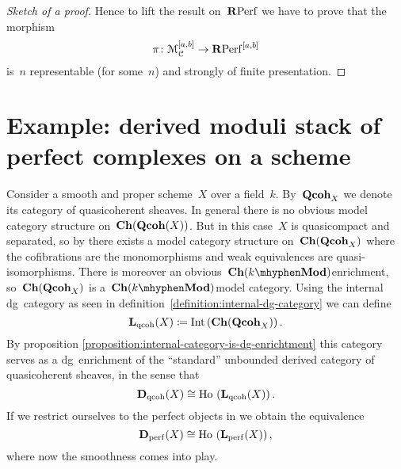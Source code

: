\begin{refsection}
\begin{theorem}
\begin{proof}[Sketch of a proof]
    Hence to lift the result on~$\mathbf{R}\mathrm{Perf}$ we have to prove that the morphism
    \begin{equation}
      \pi\colon\mathcal{M}_{\mathcal{C}}^{[a,b]}\to\mathbf{R}\mathrm{Perf}^{[a,b]}
    \end{equation}
    is~$n$ representable (for some~$n$) and strongly of finite presentation.
  \end{proof}
\end{theorem}

\section{Example: derived moduli stack of perfect complexes on a scheme}
\label{section:example}
Consider a smooth and proper scheme~$X$ over a field~$k$. By~$\mathbf{Qcoh}_X$ we denote its category of quasicoherent sheaves. In general there is no obvious model category structure on~$\mathbf{Ch}(\mathbf{Qcoh}(X))$. But in this case~$X$ is quasicompact and separated, so by \cite{hovey-sheaves} there exists a model category structure on~$\mathbf{Ch}(\mathbf{Qcoh}_X)$ where the cofibrations are the monomorphisms and weak equivalences are quasi-isomorphisms. There is moreover an obvious~$\Ch(k\mhyphen\Mod)$\dash enrichment, so~$\mathbf{Ch}(\mathbf{Qcoh}_X)$ is a~$\Ch(k\mhyphen\Mod)$\dash model category. Using the internal dg~category as seen in definition~\ref{definition:internal-dg-category} we can define
\begin{equation}
  \mathbf{L}_{\mathrm{qcoh}}(X)\coloneqq\operatorname{Int}\left( \mathbf{Ch}(\mathbf{Qcoh}_X) \right).
\end{equation}
By proposition \ref{proposition:internal-category-is-dg-enrichtment} this category serves as a dg~enrichment of the ``standard'' unbounded derived category of quasicoherent sheaves, in the sense that
\begin{equation}
  \mathbf{D}_{\mathrm{qcoh}}(X)\cong\operatorname{\mathrm{Ho} \,}\left( \mathbf{L}_{\mathrm{qcoh}}(X) \right).
\end{equation}
If we restrict ourselves to the perfect objects in we obtain the equivalence
\begin{equation}
  \mathbf{D}_{\mathrm{perf}}(X)\cong\operatorname{\mathrm{Ho} \,}\left( \mathbf{L}_{\mathrm{perf}}(X) \right),
\end{equation}
where now the smoothness comes into play.


\end{refsection}
